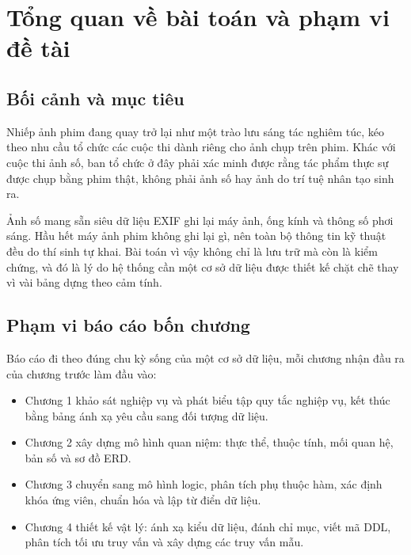 \section{Tổng quan về bài toán và phạm vi đề tài}

\subsection{Bối cảnh và mục tiêu}

Nhiếp ảnh phim đang quay trở lại như một trào lưu sáng tác nghiêm túc, kéo theo nhu cầu tổ chức các cuộc thi dành riêng cho ảnh chụp trên phim. Khác với cuộc thi ảnh số, ban tổ chức ở đây phải xác minh được rằng tác phẩm thực sự được chụp bằng phim thật, không phải ảnh số hay ảnh do trí tuệ nhân tạo sinh ra.

Ảnh số mang sẵn siêu dữ liệu EXIF ghi lại máy ảnh, ống kính và thông số phơi sáng. Hầu hết máy ảnh phim không ghi lại gì, nên toàn bộ thông tin kỹ thuật đều do thí sinh tự khai. Bài toán vì vậy không chỉ là lưu trữ mà còn là kiểm chứng, và đó là lý do hệ thống cần một cơ sở dữ liệu được thiết kế chặt chẽ thay vì vài bảng dựng theo cảm tính.

\subsection{Phạm vi báo cáo bốn chương}

Báo cáo đi theo đúng chu kỳ sống của một cơ sở dữ liệu, mỗi chương nhận đầu ra của chương trước làm đầu vào:


\begin{itemize}
    \item Chương 1 khảo sát nghiệp vụ và phát biểu tập quy tắc nghiệp vụ, kết thúc bằng bảng ánh xạ yêu cầu sang đối tượng dữ liệu.
    \item Chương 2 xây dựng mô hình quan niệm: thực thể, thuộc tính, mối quan hệ, bản số và sơ đồ ERD.
    \item Chương 3 chuyển sang mô hình logic, phân tích phụ thuộc hàm, xác định khóa ứng viên, chuẩn hóa và lập từ điển dữ liệu.
    \item Chương 4 thiết kế vật lý: ánh xạ kiểu dữ liệu, đánh chỉ mục, viết mã DDL, phân tích tối ưu truy vấn và xây dựng các truy vấn mẫu.
\end{itemize}


